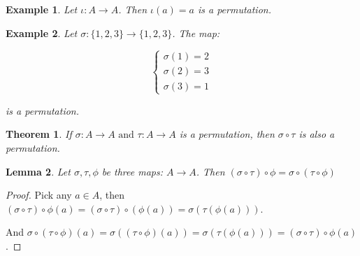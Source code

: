 \documentclass{article}
\theoremstyle{MyNonumberplain}
\theoremstyle{break}
\newtheorem*{proof}{Proof. }
\newcommand{\infixand}{\text{ and }}
\theoremstyle{break}
\newtheorem{theorem}{Theorem}[section]
\newtheorem{example}{Example}[section]
\newtheorem{lemma}[theorem]{Lemma}
\theoremstyle{break}
\theoremstyle{definition}
\theoremstyle{break}
\begin{document}
\begin{expbox}
    \begin{example}
        Let $\iota : A\to A$. Then $\iota(a)=a$ is a permutation.
    \end{example}
\end{expbox}

\begin{expbox}
    \begin{example}
        Let $\sigma:\{1,2,3\}\to\{1,2,3\}$. The map:

        $$\left\{\begin{array}{l}
            \sigma (1) = 2\\
            \sigma (2) = 3\\
            \sigma (3) = 1
          \end{array}\right.$$
        
          is a permutation.
    \end{example}
\end{expbox}

\begin{thmbox}
    \begin{theorem}
        If $\sigma : A \to A \infixand \tau : A \to A$ is a permutation, then $\sigma \circ \tau$ is also a permutation.
    \end{theorem}
\end{thmbox}

\begin{thmbox}
    \begin{lemma}
        Let $\sigma, \tau, \phi$ be three maps: $A \rightarrow A$. Then $(\sigma \circ \tau) \circ \phi = \sigma \circ (\tau \circ \phi)$    
    \end{lemma}
    \begin{prfbox}
        \begin{proof}
            Pick any $a \in A$, then $(\sigma \circ \tau) \circ \phi (a) = (\sigma \circ \tau)
            \circ (\phi (a)) = \sigma (\tau (\phi (a)))$.\bigskip

            And $\sigma \circ (\tau \circ \phi) (a) = \sigma ((\tau \circ \phi) (a)) =
            \sigma (\tau (\phi (a))) = (\sigma \circ \tau) \circ \phi (a)$.
        \end{proof}
    \end{prfbox}
\end{thmbox}
\end{document}
